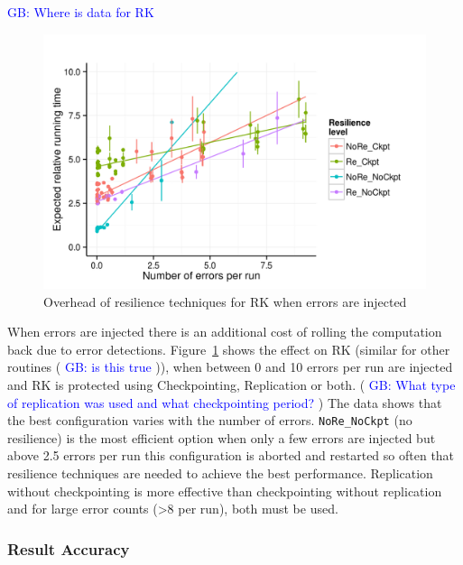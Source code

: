 \documentclass[10pt, conference, compsocconf]{IEEEtran}
\newcommand{\greg}[1]{%
  \textcolor{blue}{GB: #1}
}
\begin{document}
\greg{Where is data for RK}

\begin{figure}[ht!]
\centering
\includegraphics[width=1.00\columnwidth]{figs/4_1_2_Exp2_Expected_Running_Time_Needed.png}
\caption{Overhead of resilience techniques for RK when errors are injected}
\label{fig:rk_routine_exp_exec}
\end{figure}

When errors are injected there is an additional cost of rolling the computation back due to error detections.
Figure~\ref{fig:rk_routine_exp_exec} shows the effect on RK (similar for other routines (\greg{is this true})), when between 0 and 10 errors per run are injected and RK is protected using Checkpointing, Replication or both.
(\greg{What type of replication was used and what checkpointing period?})
The data shows that the best configuration varies with the number of errors.
\texttt{NoRe\_NoCkpt} (no resilience) is the most efficient option when only a few errors are injected but above 2.5 errors per run this configuration is aborted and restarted so often that resilience techniques are needed to achieve the best performance.
Replication without checkpointing is more effective than checkpointing without replication and for large error counts (>8 per run), both must be used.

\subsubsection{Result Accuracy}
\label{sec:res_tech:eval:accuracy}
\end{document}
